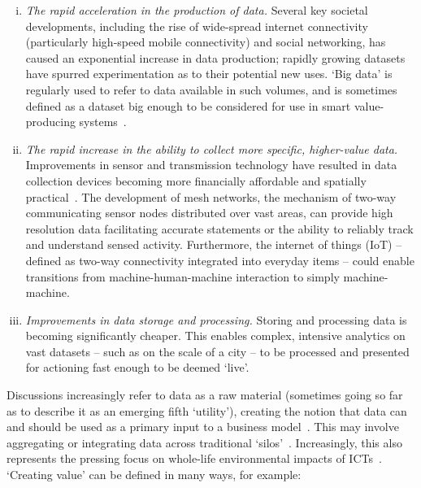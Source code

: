 \documentclass[b5paper,10pt]{article}
\begin{document}
\begin{enumerate}[i)]
\item {\emph{The rapid acceleration in the production of data.}}
Several key societal developments, including the rise of wide-spread
internet connectivity (particularly high-speed mobile connectivity)
and social networking, has caused an exponential increase in data
production; rapidly growing datasets have spurred experimentation as
to their potential new uses. `Big data' is regularly used to refer to
data available in such volumes, and is sometimes defined as a dataset
big enough to be considered for use in smart value-producing
systems~\citep{ojo-et-al:2015,sta:2017,mckinseysmartcities:2018}.
\item {\emph{The rapid increase in the ability to collect more
specific, higher-value data.}} Improvements in sensor and transmission
technology have resulted in data collection devices becoming more
financially affordable and spatially
practical~\citep{townsend:2013}. The development of mesh networks, the
mechanism of two-way communicating sensor nodes distributed over vast
areas, can provide high resolution data facilitating accurate
statements or the ability to reliably track and understand sensed
activity. Furthermore, the internet of things (IoT) -- defined as
two-way connectivity integrated into everyday items -- could enable
transitions from machine-human-machine interaction to simply
machine-machine.
\item {\emph{Improvements in data storage and processing.}} Storing
and processing data is becoming significantly cheaper. This enables
complex, intensive analytics on vast datasets -- such as on the scale
of a city -- to be processed and presented for actioning fast enough
to be deemed `live'.
\end{enumerate}

Discussions increasingly refer to data as a raw material (sometimes
going so far as to describe it as an emerging fifth `utility'),
creating the notion that data can and should be used as a primary
input to a business model~\citep{arup-et-al:2011}. This may involve
aggregating or integrating data across traditional
`silos'~\citep{shapiro:2006,tsoukalas:2008}. Increasingly, this also
represents the pressing focus on whole-life environmental impacts of
ICTs~\citep{cooper-et-al-gsict:2015}. `Creating value' can be defined
in many ways, for example:
\end{document}
